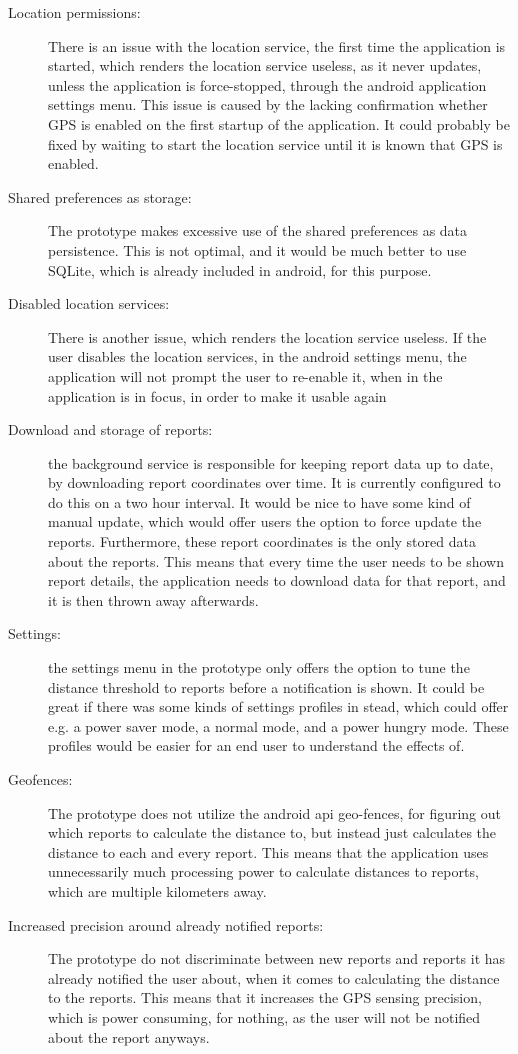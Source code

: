 \begin{description}
\item [Location permissions:] There is an issue with the location service, the first time the application is started, which renders the location service useless, as it never updates, unless the application is force-stopped, through the android application settings menu. This issue is caused by the lacking confirmation whether GPS is enabled on the first startup of the application. It could probably be fixed by waiting to start the location service until it is known that GPS is enabled.
\item [Shared preferences as storage:] The prototype makes excessive use of the shared preferences as data persistence. This is not optimal, and it would be much better to use SQLite, which is already included in android, for this purpose.
\item [Disabled location services:] There is another issue, which renders the location service useless. If the user disables the location services, in the android settings menu, the application will not prompt the user to re-enable it, when in the application is in focus, in order to make it usable again
\item [Download and storage of reports:] the background service is responsible for keeping report data up to date, by downloading report coordinates over time. It is currently configured to do this on a two hour interval. It would be nice to have some kind of manual update, which would offer users the option to force update the reports. Furthermore, these report coordinates is the only stored data about the reports. This means that every time the user needs to be shown report details, the application needs to download data for that report, and it is then thrown away afterwards.
\item [Settings:] the settings menu in the prototype only offers the option to tune the distance threshold to reports before a notification is shown. It could be great if there was some kinds of settings profiles in stead, which could offer e.g. a power saver mode, a  normal mode, and a power hungry mode. These profiles would be easier for an end user to understand the effects of.
\item [Geofences:] The prototype does not utilize the android api geo-fences, for figuring out which reports to calculate the distance to, but instead just calculates the distance to each and every report. This means that the application uses unnecessarily much processing power to calculate distances to reports, which are multiple kilometers away.
\item [Increased precision around already notified reports:] The prototype do not discriminate between new reports and reports it has already notified the user about, when it comes to calculating the distance to the reports. This means that it increases the GPS sensing precision, which is power consuming, for nothing, as the user will not be notified about the report anyways.
\end{description}


